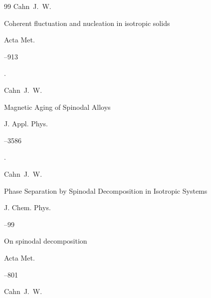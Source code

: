 \begin{thebibliography}{99}
\by Cahn~J.~W.

\paper Coherent fluctuation and nucleation in isotropic solids

\jour Acta Met.




--913


\moreref 

. \nofrills






\by Cahn~J.~W.

\paper Magnetic Aging of Spinodal Alloys

\jour J. Appl. Phys.




--3586


\moreref {}. \nofrills






\by Cahn~J.~W.

\paper Phase Separation by Spinodal Decomposition in Isotropic Systems

\jour J. Chem. Phys.




--99









\paper On spinodal decomposition



\jour Acta Met.


--801

\by Cahn~J.~W.


\end{thebibliography}
